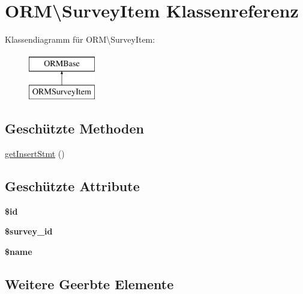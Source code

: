 \hypertarget{class_o_r_m_1_1_survey_item}{\section{O\-R\-M\textbackslash{}Survey\-Item Klassenreferenz}
\label{class_o_r_m_1_1_survey_item}
}
Klassendiagramm für O\-R\-M\textbackslash{}Survey\-Item\-:\begin{figure}[H]
\begin{center}
\leavevmode
\includegraphics[height=2.000000cm]{class_o_r_m_1_1_survey_item}
\end{center}
\end{figure}
\subsection*{Geschützte Methoden}
\begin{DoxyCompactItemize}
\item 
\hyperlink{class_o_r_m_1_1_survey_item_a59e2dfd9594f69554297a2ef0e4a124d}{get\-Insert\-Stmt} ()
\end{DoxyCompactItemize}
\subsection*{Geschützte Attribute}
\begin{DoxyCompactItemize}
\item 
\hypertarget{class_o_r_m_1_1_survey_item_a2d1804a126b2bffd491fbded0a679b95}{{\bfseries \$id}}\label{class_o_r_m_1_1_survey_item_a2d1804a126b2bffd491fbded0a679b95}

\item 
\hypertarget{class_o_r_m_1_1_survey_item_a37630e29d99dd2556e2d292c01e41ad2}{{\bfseries \$survey\-\_\-id}}\label{class_o_r_m_1_1_survey_item_a37630e29d99dd2556e2d292c01e41ad2}

\item 
\hypertarget{class_o_r_m_1_1_survey_item_a0d4014e16863b52a5961f3d7438f5296}{{\bfseries \$name}}\label{class_o_r_m_1_1_survey_item_a0d4014e16863b52a5961f3d7438f5296}

\end{DoxyCompactItemize}
\subsection*{Weitere Geerbte Elemente}


